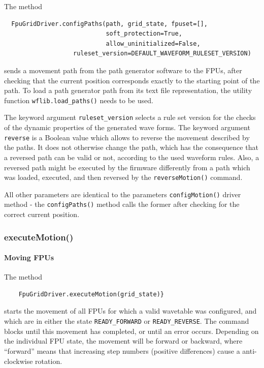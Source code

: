 \documentclass[11pt,a4paper]{report}
\begin{document}
The method
\begin{verbatim}
  FpuGridDriver.configPaths(path, grid_state, fpuset=[],
                            soft_protection=True,
                            allow_uninitialized=False,
                   ruleset_version=DEFAULT_WAVEFORM_RULESET_VERSION)
\end{verbatim}
sends a movement path from the path generator software to the FPUs,
after checking that the current position corresponds exactly to the
starting point of the path.  To load a path generator path from its
text file representation, the utility function
\texttt{wflib.load\_paths()} needs to be used.

The keyword argument \texttt{ruleset\_version} selects a rule set
version for the checks of the dynamic properties of the generated wave
forms. The keyword argument \texttt{reverse} is a Boolean value which
allows to reverse the movement described by the paths. It does not
otherwise change the path, which has the consequence that a reversed
path can be valid or not, according to the used waveform rules. Also,
a reversed path might be executed by the firmware differently from a
path which was loaded, executed, and then reversed by the
\texttt{reverseMotion()} command.

All other parameters are identical to the parameters
\texttt{configMotion()} driver method - the \texttt{configPaths()}
method calls the former after checking for the correct current
position.


\subsubsection{executeMotion()}

\paragraph{Moving FPUs}

\begin{sloppypar}
  The method
  \begin{verbatim}
    FpuGridDriver.executeMotion(grid_state)}
  \end{verbatim}
  starts the movement of all FPUs for which a valid wavetable was
  configured, and which are in either the state
  \texttt{READY\_FORWARD} or \texttt{READY\_REVERSE}. The command
  blocks until this movement has completed, or until an error
  occurs. Depending on the individual FPU state, the movement will be
  forward or backward, where ``forward'' means that increasing step
  numbers (positive differences) cause a anti-clockwise rotation.
\end{sloppypar}
\end{document}
